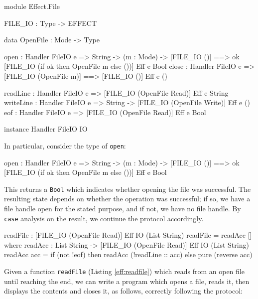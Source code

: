 \begin{code}[float=h,frame=single, caption={File I/O Effect}, label=eff:fileio]
module Effect.File

FILE_IO : Type -> EFFECT

data OpenFile : Mode -> Type

open  : Handler FileIO e => String -> (m : Mode) -> 
        { [FILE_IO ()] ==> 
          {ok} [FILE_IO (if ok then OpenFile m else ())] } Eff e Bool
close : Handler FileIO e =>
        { [FILE_IO (OpenFile m)] ==> [FILE_IO ()] } Eff e ()

readLine  : Handler FileIO e => 
           { [FILE_IO (OpenFile Read)] } Eff e String 
writeLine : Handler FileIO e => String -> 
           { [FILE_IO (OpenFile Write)] } Eff e ()
eof       : Handler FileIO e => 
           { [FILE_IO (OpenFile Read)] } Eff e Bool 

instance Handler FileIO IO
\end{code}

\noindent
In particular, consider the type of \texttt{open}:

\begin{code}
open  : Handler FileIO e => String -> (m : Mode) -> 
        { [FILE_IO ()] ==> 
          {ok} [FILE_IO (if ok then OpenFile m else ())] } Eff e Bool
\end{code}

\noindent
This returns a \texttt{Bool} which indicates whether opening the file was
successful. The resulting state depends on whether the operation was successful;
if so, we have a file handle open for the stated purpose, and if not, we have
no file handle. By \texttt{case} analysis on the result, we continue the
protocol accordingly.

\begin{code}[float=h,frame=single, caption={Reading a File}, label=eff:readfile]
readFile : { [FILE_IO (OpenFile Read)] } Eff IO (List String)
readFile = readAcc [] where
    readAcc : List String -> { [FILE_IO (OpenFile Read)] }
              Eff IO (List String)
    readAcc acc = if (not !eof)
                     then readAcc (!readLine :: acc)
                     else pure (reverse acc)
\end{code}

Given a function \texttt{readFile} (Listing \ref{eff:readfile})
which reads from an open file until reaching the end, we can write a program
which opens a file, reads it, then displays the contents and closes it,
as follows, correctly following the protocol:

